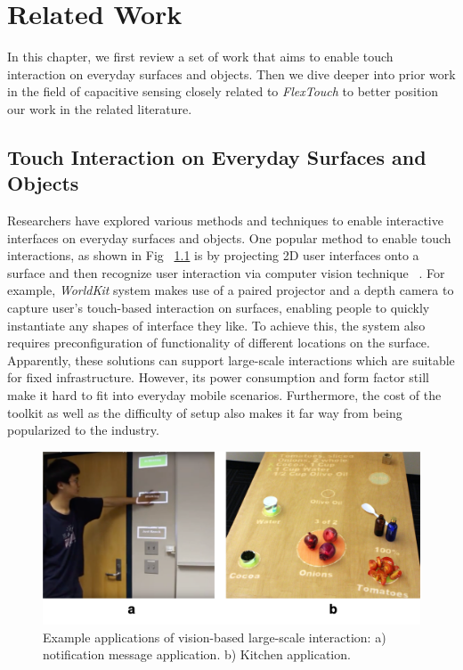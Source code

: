 \chapter{Related Work}
In this chapter, we first review a set of work that aims to enable touch interaction on everyday surfaces and objects. Then we dive deeper into prior work in the field of capacitive sensing closely related to \textit{FlexTouch} to better position our work in the related literature.

\section{Touch Interaction on Everyday Surfaces and Objects}
Researchers have explored various methods and techniques to enable interactive interfaces on everyday surfaces and objects. One popular method to enable touch interactions, as shown in Fig ~\ref{fig:cv-large-scale-interaction} is by projecting 2D user interfaces onto a surface and then recognize user interaction via computer vision technique ~\cite{pinhanez2001everywhere, Fails-2002-Light-Widgets, Wilson-2010-Light-Space, Xiao-WorldKit}. For example, \textit{WorldKit} system makes use of a paired projector and a depth camera to capture user's touch-based interaction on surfaces, enabling people to quickly instantiate any shapes of interface they like. To achieve this, the system also requires preconfiguration of functionality of different locations on the surface. Apparently, these solutions can support large-scale interactions which are suitable for fixed infrastructure. However, its power consumption and form factor still make it hard to fit into everyday mobile scenarios. Furthermore, the cost of the toolkit as well as the difficulty of setup also makes it far way from being popularized to the industry.

\begin{figure}[ht]
    \centering
	\includegraphics[width=0.78\columnwidth]{figures/cv-large-scale-sensing.png}
	\setlength{\belowcaptionskip}{-6pt}
    \caption{Example applications of vision-based large-scale interaction: a) notification message application. b) Kitchen application.}
    \label{fig:cv-large-scale-interaction}
\end{figure}

